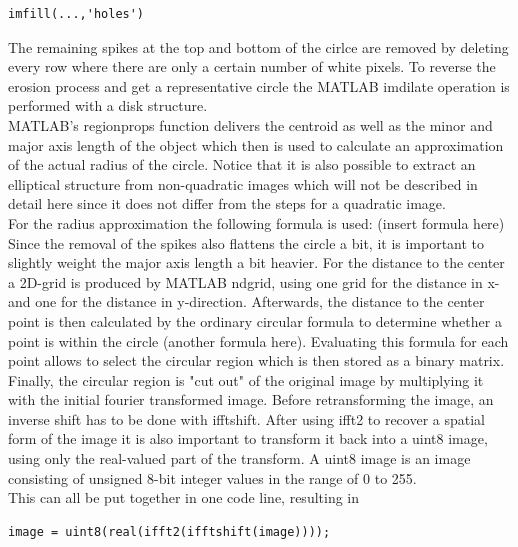 \documentclass{article}
\begin{document}
\begin{verbatim}imfill(...,'holes') \end{verbatim}
The remaining spikes at the top and bottom of the cirlce are removed by deleting every row where there are only a certain number of white pixels. To reverse the erosion process and get a representative circle the MATLAB imdilate operation is performed with a disk structure. \\
MATLAB's regionprops function delivers the centroid as well as the minor and major axis length of the object which then is used to calculate an approximation of the actual radius of the circle. Notice that it is also possible to extract an elliptical structure from non-quadratic images which will not be described in detail here since it does not differ from the steps for a quadratic image. \\
For the radius approximation the following formula is used: (insert formula here) \\
Since the removal of the spikes also flattens the circle a bit, it is important to slightly weight the major axis length a bit heavier.  For the distance to the center a 2D-grid is produced by MATLAB ndgrid, using one grid for the distance in x- and one for the distance in y-direction. Afterwards, the distance to the center point is then calculated by the ordinary circular formula to determine whether a point is within the circle (another formula here). Evaluating this formula for each point allows to select the circular region which is then stored as a binary matrix. \\
Finally, the circular region is "cut out" of the original image by multiplying it with the initial fourier transformed image. Before retransforming the image, an inverse shift has to be done with ifftshift. After using ifft2 to recover a spatial form of the image it is also important to transform it back into a uint8 image, using only the real-valued part of the transform. A uint8 image is an image consisting of unsigned 8-bit integer values in the range of 0 to 255.\\
This can all be put together in one code line, resulting in
\begin{verbatim}
image = uint8(real(ifft2(ifftshift(image))));
\end{verbatim}

\end{document}
